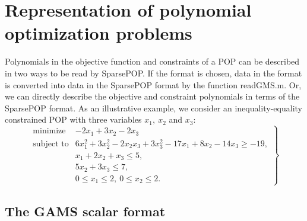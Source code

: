\section{Representation of polynomial optimization problems}
\label{Representation}

Polynomials in the objective
function and constraints of a POP can be described in two ways to be read by SparsePOP. 
If the \GMS format is chosen,  
data in the \GMS format  is converted into data in the SparsePOP 
format by the function readGMS.m. Or, we can directly
describe the objective and constraint polynomials in terms 
of the SparsePOP format. 
As an illustrative example, we consider an inequality-equality constrained POP with three 
variables $x_1, \ x_2$ and $x_3$: 
\begin{equation}
\left. 
 \begin{array}{ll}
	\mbox{minimize} & -2x_1 +3x_2 -2x_3                     \\
	\mbox{subject to} & 6x_1^2  + 3x_2^2-2x_2x_3 + 3 x_3^2 -
		17x_1 + 8 x_2 - 14 x_3 \geq -19, \\
		& x_1 + 2 x_2 + x_3 \leq 5, \\
		& 5 x_2 + 3 x_3 \leq 7, \\
	 &  0 \leq x_1 \leq 2, \ 0 \leq x_2 \leq  2.  
	\end{array}
\right\} 
\label{Bex314}
\end{equation}

\subsection{The GAMS scalar format}

